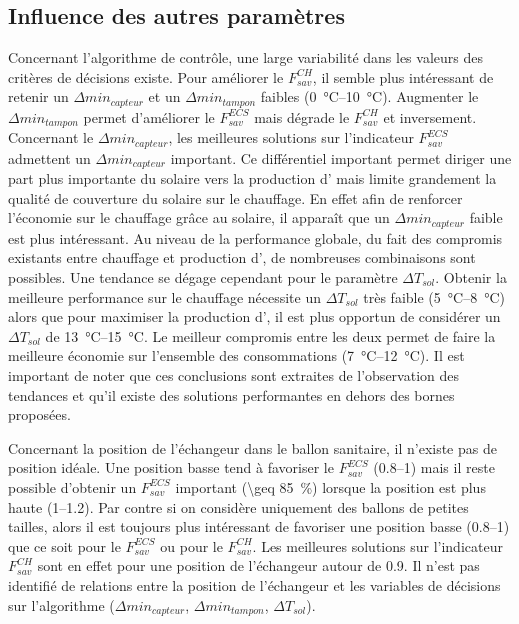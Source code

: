 \subsection{Influence des autres paramètres} %
\label{sub:influence_des_autres_parametres}
Concernant l’algorithme de contrôle, une large variabilité dans les valeurs des critères de décisions existe.
Pour améliorer le $F_{sav}^{CH}$, il semble plus intéressant de retenir un $\Delta
min_{capteur}$ et un $\Delta min_{tampon}$ faibles (\SIrange{0}{10}{\celsius}). Augmenter
le $\Delta min_{tampon}$ permet d’améliorer le $F_{sav}^{ECS}$ mais dégrade le
$F_{sav}^{CH}$ et inversement. Concernant le $\Delta min_{capteur}$, les meilleures
solutions sur l’indicateur $F_{sav}^{ECS}$ admettent un $\Delta min_{capteur}$ important.
Ce différentiel important permet diriger une part plus importante du solaire vers la
production d’ mais limite grandement la qualité de couverture du solaire sur le
chauffage. En effet afin de renforcer l’économie sur le chauffage grâce au solaire, il
apparaît que un $\Delta min_{capteur}$ faible est plus intéressant. Au niveau de la
performance globale, du fait des compromis existants entre chauffage et production
d’, de nombreuses combinaisons sont possibles. Une tendance se dégage
cependant pour le paramètre $\Delta T_{sol}$.
Obtenir la meilleure performance sur le chauffage nécessite un $\Delta T_{sol}$
très faible (\SIrange{5}{8}{\celsius}) alors que pour maximiser la production
d’, il est plus opportun de considérer un $\Delta T_{sol}$ de
\SIrange{13}{15}{\celsius}. Le meilleur compromis entre les deux permet de faire la
meilleure économie sur l’ensemble des consommations (\SIrange{7}{12}{\celsius}).
Il est important de noter que ces conclusions sont extraites de l’observation des
tendances et qu’il existe des solutions performantes en dehors des bornes proposées.

Concernant la position de l’échangeur dans le ballon sanitaire, il n’existe pas de
position idéale. Une position basse tend à favoriser le $F_{sav}^{ECS}$ (\numrange{0.8}{1})
mais il reste possible d’obtenir un $F_{sav}^{ECS}$ important (\SI{\geq 85}{\percent})
lorsque la position est plus haute (\numrange{1}{1.2}). Par contre si on considère uniquement
des ballons de petites tailles, alors il est toujours plus intéressant de favoriser une
position basse (\numrange{0.8}{1}) que ce soit pour le $F_{sav}^{ECS}$ ou pour le $F_{sav}^{CH}$.
Les meilleures solutions sur l’indicateur $F_{sav}^{CH}$ sont en effet pour une position
de l’échangeur autour de \num{0.9}. Il n’est pas identifié de relations entre la position de l’échangeur
et les variables de décisions sur l’algorithme ($\Delta min_{capteur}$, $\Delta min_{tampon}$,
$\Delta T_{sol}$).

